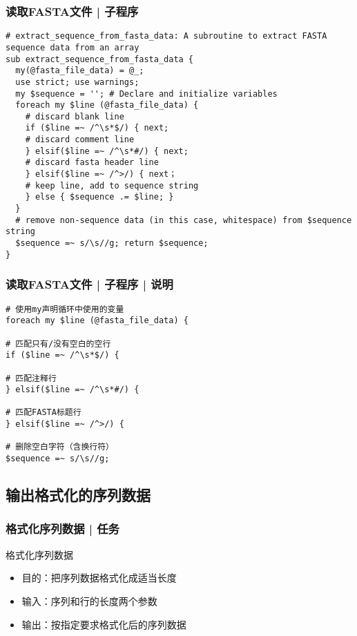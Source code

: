 \begin{frame}[fragile]
  \frametitle{读取FASTA文件 | 子程序}
  \vspace{-0.8em}
\begin{lstlisting}[firstnumber=31,basicstyle=\footnotesize\tt,numberstyle=\scriptsize]
# extract_sequence_from_fasta_data: A subroutine to extract FASTA sequence data from an array
sub extract_sequence_from_fasta_data {
  my(@fasta_file_data) = @_;
  use strict; use warnings;
  my $sequence = ''; # Declare and initialize variables
  foreach my $line (@fasta_file_data) {
    # discard blank line
    if ($line =~ /^\s*$/) { next;
    # discard comment line 
    } elsif($line =~ /^\s*#/) { next;
    # discard fasta header line
    } elsif($line =~ /^>/) { next；
    # keep line, add to sequence string
    } else { $sequence .= $line; }
  }
  # remove non-sequence data (in this case, whitespace) from $sequence string
  $sequence =~ s/\s//g; return $sequence;
}
\end{lstlisting}
\end{frame}

\begin{frame}[fragile]
  \frametitle{读取FASTA文件 | 子程序 | \alert{说明}}
\begin{lstlisting}
# 使用my声明循环中使用的变量
foreach my $line (@fasta_file_data) {

# 匹配只有/没有空白的空行
if ($line =~ /^\s*$/) {

# 匹配注释行
} elsif($line =~ /^\s*#/) {

# 匹配FASTA标题行
} elsif($line =~ /^>/) {

# 删除空白字符（含换行符）
$sequence =~ s/\s//g;
\end{lstlisting}
\end{frame}

\subsection{输出格式化的序列数据}
\begin{frame}
  \frametitle{格式化序列数据 | 任务}
  \begin{block}{格式化序列数据}
    \begin{itemize}
      \item 目的：把序列数据格式化成适当长度
      \item 输入：序列和行的长度两个参数
      \item 输出：按指定要求格式化后的序列数据
    \end{itemize}
  \end{block}
\end{frame}

